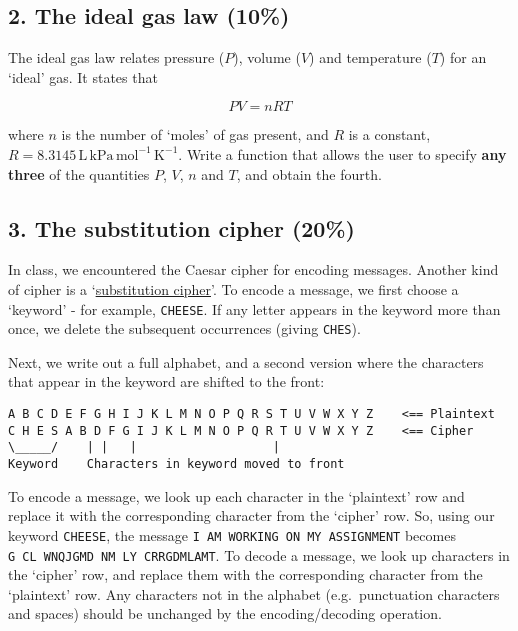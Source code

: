 \documentclass[11pt]{article}
\begin{document}
    \hypertarget{the-ideal-gas-law-10}{%
\subsection*{2. The ideal gas law (10\%)}\label{the-ideal-gas-law-10}}

The ideal gas law relates pressure (\(P\)), volume (\(V\)) and
temperature (\(T\)) for an `ideal' gas. It states that

\[ PV = nRT \]

where \(n\) is the number of `moles' of gas present, and \(R\) is a
constant,
\(R = 8.3145\,\mathrm{L}\,\mathrm{kPa}\,\mathrm{mol}^{-1}\,\mathrm{K}^{-1}\).
Write a function that allows the user to specify \textbf{any three} of
the quantities \(P\), \(V\), \(n\) and \(T\), and obtain the fourth.

    \hypertarget{the-substitution-cipher-20}{%
\subsection*{3. The substitution cipher
(20\%)}\label{the-substitution-cipher-20}}

In class, we encountered the Caesar cipher for encoding messages.
Another kind of cipher is a
`\href{https://en.wikipedia.org/wiki/Substitution_cipher}{substitution
cipher}'. To encode a message, we first choose a `keyword' - for
example, \texttt{CHEESE}. If any letter appears in the keyword more than
once, we delete the subsequent occurrences (giving \texttt{CHES}).

Next, we write out a full alphabet, and a second version where the
characters that appear in the keyword are shifted to the front:

\begin{verbatim}
A B C D E F G H I J K L M N O P Q R S T U V W X Y Z    <== Plaintext
C H E S A B D F G I J K L M N O P Q R T U V W X Y Z    <== Cipher
\_____/    | |   |                   |    
Keyword    Characters in keyword moved to front
\end{verbatim}

To encode a message, we look up each character in the `plaintext' row
and replace it with the corresponding character from the `cipher' row.
So, using our keyword \texttt{CHEESE}, the message
\texttt{I\ AM\ WORKING\ ON\ MY\ ASSIGNMENT} becomes
\texttt{G\ CL\ WNQJGMD\ NM\ LY\ CRRGDMLAMT}. To decode a message, we
look up characters in the `cipher' row, and replace them with the
corresponding character from the `plaintext' row. Any characters not in
the alphabet (e.g.~punctuation characters and spaces) should be
unchanged by the encoding/decoding operation.
\end{document}
